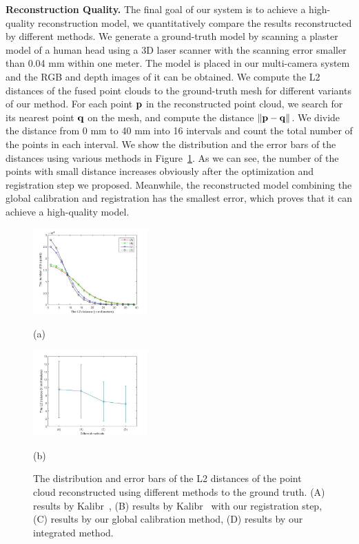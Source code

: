 \noindent\textbf{Reconstruction Quality.}
The final goal of our system is to achieve a high-quality reconstruction model, we quantitatively compare the results reconstructed by different methods.
%
We generate a ground-truth model by scanning a plaster model of a human head using a 3D laser scanner with the scanning error smaller than 0.04 mm within one meter.
%
The model is placed in our multi-camera system and the RGB and depth images of it can be obtained.
We compute the L2 distances of the fused point clouds to the ground-truth mesh for different variants of our method.
For each point $\mathbf{p}$ in the reconstructed point cloud, we search for its nearest point $\mathbf{q}$ on the mesh, and compute the distance $\|\mathbf{p}-\mathbf{q}\|$.
%
We divide the distance from 0 mm to 40 mm into 16 intervals and count the total number of the points in each interval. We show the distribution and the error bars of the distances using various methods in Figure~\ref{fig:histogram}. As we can see, the number of the points with small distance increases obviously after the optimization and registration step we proposed. Meanwhile, the reconstructed model combining the global calibration and registration has the smallest error, which proves that it can achieve a high-quality model.
\begin{figure}[ht]
%
\begin{minipage}[c]{0.49\linewidth}
  \centering
\includegraphics[width=4.4cm]{image/distribution.jpg}

  \centerline{(a)}\medskip
\end{minipage}
\hfill
\begin{minipage}[c]{0.49\linewidth}
  \centering
\includegraphics[width=4.4cm]{image/errorbar.jpg}

  \centerline{(b)}\medskip
\end{minipage}
%
\caption{The distribution and error bars of the L2 distances of the point cloud reconstructed using different methods to the ground truth. (A) results by Kalibr~\cite{Maye2013Self}, (B) results by Kalibr~\cite{Maye2013Self} with our registration step, (C) results by our global calibration method, (D) results by our integrated method.}
\label{fig:histogram}
\end{figure}


